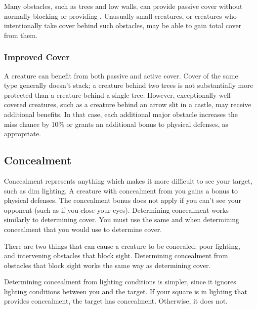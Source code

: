          Many obstacles, such as trees and low walls, can provide passive cover without normally blocking  or providing .
        Unusually small creatures, or creatures who intentionally take cover behind such obstacles, may be able to gain total cover from them.

        \subsubsection{Improved Cover}

            A creature can benefit from both passive and active cover.
            Cover of the same type generally doesn't stack; a creature behind two trees is not substantially more protected than a creature behind a single tree.
            However, exceptionally well covered creatures, such as a creature behind an arrow slit in a castle, may receive additional benefits.
            In that case, each additional major obstacle increases the miss chance by 10\% or grants an additional  bonus to physical defenses, as appropriate.

    \subsection{Concealment}\label{Concealment}
        Concealment represents anything which makes it more difficult to see your target, such as dim lighting. A creature with concealment from you gains a  bonus to physical defenses. The concealment bonus does not apply if you can't see your opponent (such as if you close your eyes).
        Determining concealment works similarly to determining cover.
        You must use the same  and  when determining concealment that you would use to determine cover.

         There are two things that can cause a creature to be concealed: poor lighting, and intervening obstacles that block sight.
        Determining concealment from obstacles that block sight works the same way as determining cover.

        Determining concealment from lighting conditions is simpler, since it ignores lighting conditions between you and the target.
        If your  square is in lighting that provides concealment, the target has concealment.
        Otherwise, it does not.

